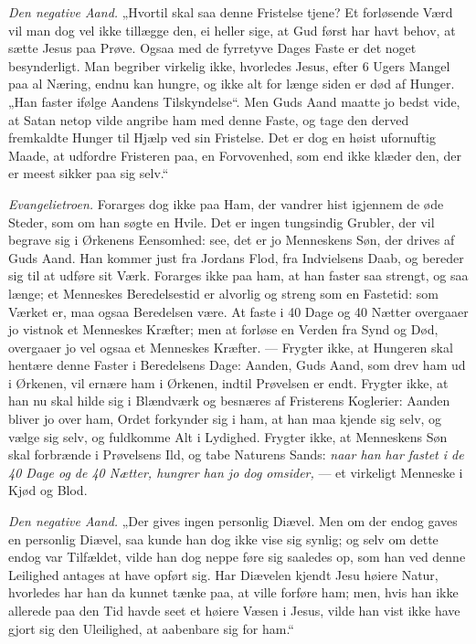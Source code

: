\documentclass[12pt,a4paper]{book}
\begin{document}
\emph{Den negative Aand.} „Hvortil skal saa denne Fristelse tjene? Et forløsende Værd vil
man dog vel ikke tillægge den, ei heller sige, at Gud først har havt behov, at sætte Jesus
paa Prøve. Ogsaa med de fyrretyve Dages Faste er det noget
besynderligt. Man begriber virkelig ikke, hvorledes Jesus, efter 6 Ugers Mangel paa al
Næring, endnu kan hungre, og ikke alt for længe siden er død af Hunger. „Han faster ifølge
Aandens Tilskyndelse“. Men Guds Aand maatte jo bedst vide, at Satan netop vilde angribe
ham med denne Faste, og tage den derved fremkaldte Hunger til Hjælp ved sin Fristelse. Det
er dog en høist ufornuftig Maade, at udfordre Fristeren paa, en Forvovenhed, som end ikke
klæder den, der er meest sikker paa sig selv.“

\emph{Evangelietroen.} Forarges dog ikke paa Ham, der vandrer hist igjennem de øde Steder,
som om han søgte en Hvile. Det er ingen tungsindig Grubler, der vil begrave sig i
Ørkenens Eensomhed: see, det er jo Menneskens Søn, der drives af Guds Aand. Han kommer
just fra Jordans Flod, fra Indvielsens Daab, og bereder sig til at udføre sit Værk.
Forarges ikke paa ham, at han faster saa strengt, og saa længe; et Menneskes
Beredelsestid er alvorlig og streng som en Fastetid: som Værket er, maa ogsaa Beredelsen
være. At faste i 40 Dage og 40 Nætter overgaaer jo vistnok et Menneskes Kræfter; men at
forløse en Verden fra Synd og Død, overgaaer jo vel ogsaa et Menneskes Kræfter. ---
Frygter ikke, at Hungeren skal hentære denne Faster i Beredelsens Dage: Aanden, Guds Aand,
som drev ham ud i Ørkenen, vil ernære ham i Ørkenen, indtil Prøvelsen er endt. Frygter
ikke, at han nu skal hilde sig i Blændværk og besnæres af Fristerens Koglerier: Aanden
bliver jo over ham, Ordet forkynder sig i ham, at han maa kjende sig selv, og vælge sig
selv, og fuldkomme Alt i Lydighed. Frygter ikke, at Menneskens Søn skal forbrænde i
Prøvelsens Ild, og tabe Naturens Sands: \emph{naar han har fastet i de 40 Dage og de 40
Nætter, hungrer han jo dog omsider,} --- et virkeligt Menneske i Kjød og Blod.

\emph{Den negative Aand.} „Der gives ingen personlig
Diævel. Men om der endog gaves en personlig Diævel, saa kunde han dog ikke vise sig
synlig; og selv om dette endog var Tilfældet, vilde han dog neppe føre sig saaledes op,
som han ved denne Leilighed antages at have opført sig. Har Diævelen kjendt Jesu høiere
Natur, hvorledes har han da kunnet tænke paa, at ville forføre ham; men, hvis han ikke
allerede paa den Tid havde seet et høiere Væsen i Jesus, vilde han vist ikke have gjort
sig den Uleilighed, at aabenbare sig for ham.“
\end{document}
